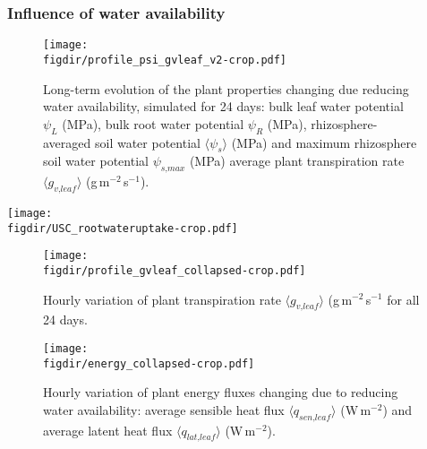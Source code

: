 \subsubsection*{Influence of water availability}

\begin{figure}[p]
	\centering
	\texttt{[image: \\figdir/profile\_psi\_gvleaf\_v2-crop.pdf]}
	\caption{Long-term evolution of the plant properties changing due reducing water availability, simulated for 24 days:  bulk leaf water potential $\psi_L$ (MPa), bulk root water potential $\psi_R$ (MPa), rhizosphere-averaged soil water potential $\langle \psi_s \rangle$ (MPa) and maximum rhizosphere soil water potential $\psi_{\textit{s,max}}$ (MPa)  average plant transpiration rate $\langle g_{\textit{v,leaf}} \rangle$ (g\,m$^{-2}$\,s$^{-1}$). }
	\label{fig:profile_psi_gvleaf}
\end{figure}

\begin{sidewaysfigure}[p]
	\centering
	\texttt{[image: \\figdir/USC\_rootwateruptake-crop.pdf]}
	\caption{}
	\label{fig:USC_rootwateruptake}
\end{sidewaysfigure}

\begin{figure}[p]
	\centering
	\texttt{[image: \\figdir/profile\_gvleaf\_collapsed-crop.pdf]}
	\caption{Hourly variation of plant transpiration rate $\langle g_{\textit{v,leaf}} \rangle$ (g\,m$^{-2}$\,s$^{-1}$ for all 24 days.}
	\label{fig:profile_gvleaf_collapsed}
\end{figure}

\begin{figure}[p]
	\centering
	\texttt{[image: \\figdir/energy\_collapsed-crop.pdf]}
	\caption{Hourly variation of plant energy fluxes changing due to reducing water availability:  average sensible heat flux $\langle q_{\textit{sen,leaf}} \rangle$ (W\,m$^{-2}$) and  average latent heat flux $\langle q_{\textit{lat,leaf}} \rangle$ (W\,m$^{-2}$). }
	\label{fig:energy_collapsed}
\end{figure}

